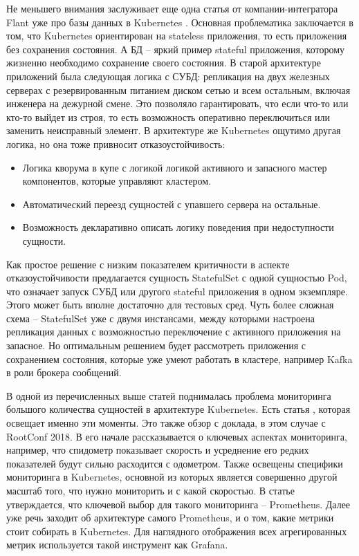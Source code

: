 Не меньшего внимания заслуживает еще одна статья от компании-интегратора Flant уже про базы данных в Kubernetes \cite{habr:flant:db-and-k8s}. Основная проблематика заключается в том, что Kubernetes ориентирован на stateless приложения, то есть приложения без сохранения состояния. А БД
-- яркий пример stateful приложения,
которому жизненно необходимо сохранение своего состояния. В старой архитектуре приложений была следующая логика с СУБД: репликация на двух железных серверах с резервированным питанием диском сетью и всем остальным, включая инженера на дежурной смене. Это позволяло гарантировать, что если что-то или кто-то выйдет из строя, то есть возможность оперативно переключиться или заменить неисправный элемент. В архитектуре же Kubernetes ощутимо другая логика, но она тоже привносит отказоустойчивость:
\begin{itemize}
    \item Логика кворума в купе с логикой логикой активного и запасного мастер компонентов, которые управляют кластером.
    \item Автоматический переезд сущностей с упавшего сервера на остальные.
    \item Возможность декларативно описать логику поведения при недоступности сущности.
\end{itemize}

Как простое решение с низким показателем критичности в аспекте отказоустойчивости предлагается сущность StatefulSet с одной сущностью Pod, что означает запуск СУБД
или другого stateful приложения в одном экземпляре. Этого может быть вполне достаточно для тестовых сред. Чуть более сложная схема -- StatefulSet уже с двумя инстансами, между которыми настроена репликация данных с возможностью переключение с активного приложения на запасное. Но оптимальным решением будет рассмотреть приложения с сохранением состояния, которые уже умеют работать в кластере, например Kafka
в роли брокера сообщений.

В одной из перечисленных выше статей поднималась проблема мониторинга большого количества сущностей в архитектуре Kubernetes. Есть статья \cite{habr:flant:k8s-mon}, которая освещает именно эти моменты. Это также обзор с доклада, в этом случае с RootConf 2018. В его начале рассказывается о ключевых аспектах мониторинга, например, что спидометр показывает скорость и усреднение его редких показателей будут сильно расходится с одометром. Также освещены специфики мониторинга в Kubernetes, основной из которых является совершенно другой масштаб того, что нужно мониторить и с какой скоростью. В статье утверждается, что ключевой выбор для такого мониторинга -- Prometheus. Далее уже речь заходит об архитектуре самого Prometheus, и о том, какие метрики стоит собирать в Kubernetes. Для наглядного отображения всех агрегированных метрик используется такой инструмент как Grafana.

